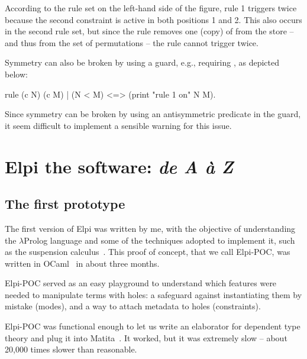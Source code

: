 \documentclass{these-ISSS}
\newenvironment{chrcode}
  {\VerbatimEnvironment\begin{chrbox}\begin{xelpicode}}{\end{xelpicode}
  \end{chrbox}}
\begin{document}
According to the rule set on the left-hand side of the figure, rule 1
triggers twice because the second  constraint is active in both
positions 1 and 2. This also occurs in the second rule set, but since the
rule removes one (copy) of  from the store -- and thus from the set of
permutations -- the rule cannot trigger twice.

Symmetry can also be broken by using a guard, e.g., requiring
, as depicted below:

\begin{chrcode}
rule (c N) (c M) | (N < M) <=>
  (print "rule 1 on" N M).
\end{chrcode}
Since symmetry can be broken by using an antisymmetric predicate in the
guard, it seem difficult to implement a sensible warning for
this issue.


\chapter{Elpi the software: \emph{de A \`a Z}}

\section{The first prototype}\label{sec:poc}


The first version of Elpi was written by me, with the
objective of understanding the $\lambda$Prolog language and some of the
techniques adopted to implement it, such as the suspension
calculus~\cite{NADATHUR200235}. This proof of concept, that we call Elpi-POC,
was written in OCaml~\cite{leroy3ocaml}  in about three months.

Elpi-POC served as an easy playground to understand which features were needed
to manipulate terms with holes: a safeguard against instantiating them by
mistake (modes), and a way to attach metadata to holes (constraints).


Elpi-POC was functional enough to let us write an elaborator for dependent type
theory and plug it into Matita~\cite{DBLP:conf/cade/AspertiRCT11}. It worked,
but it was extremely slow -- about 20,000 times slower than reasonable.
\end{document}
